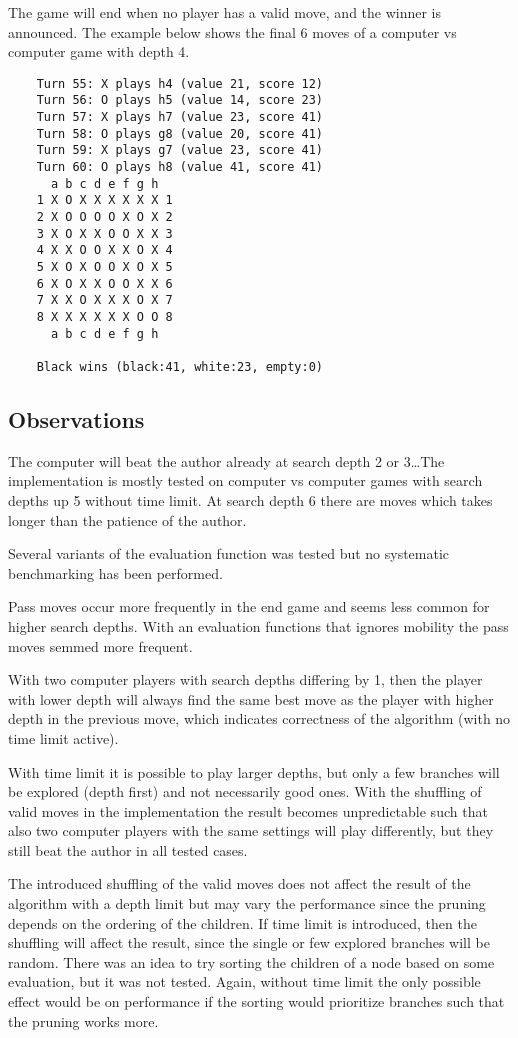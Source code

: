 \documentclass[a4paper]{article}
\begin{document}
The game will end when no player has a valid move, and the winner is announced. The example below shows the final 6 moves of a computer vs computer game with depth 4.
\begin{verbatim}
    Turn 55: X plays h4 (value 21, score 12)
    Turn 56: O plays h5 (value 14, score 23)
    Turn 57: X plays h7 (value 23, score 41)
    Turn 58: O plays g8 (value 20, score 41)
    Turn 59: X plays g7 (value 23, score 41)
    Turn 60: O plays h8 (value 41, score 41)
      a b c d e f g h
    1 X O X X X X X X 1
    2 X O O O O X O X 2
    3 X O X X O O X X 3
    4 X X O O X X O X 4
    5 X O X O O X O X 5
    6 X O X X O O X X 6
    7 X X O X X X O X 7
    8 X X X X X X O O 8
      a b c d e f g h
    
    Black wins (black:41, white:23, empty:0)
\end{verbatim}

\subsection{Observations}
The computer will beat the author already at search depth 2 or 3\ldots The implementation is mostly tested on computer vs computer games with search depths up 5 without time limit. At search depth 6 there are moves which takes longer than the patience of the author. 

Several variants of the evaluation function was tested but no systematic benchmarking has been performed. 

Pass moves occur more frequently in the end game and seems less common for higher search depths. With an evaluation functions that ignores mobility the pass moves semmed more frequent.

With two computer players with search depths differing by 1, then the player with lower depth will always find the same best move as the player with higher depth in the previous move, which indicates correctness of the algorithm (with no time limit active). 

With time limit it is possible to play larger depths, but only a few branches will be explored (depth first) and not necessarily good ones. With the shuffling of valid moves in the implementation the result becomes unpredictable such that also two computer players with the same settings will play differently, but they still beat the author in all tested cases. 

The introduced shuffling of the valid moves does not affect the result of the algorithm with a depth limit but may vary the performance since the pruning depends on the ordering of the children. If time limit is introduced, then the shuffling will affect the result, since the single or few explored branches will be random. There was an idea to try sorting the children of a node based on some evaluation, but it was not tested. Again, without time limit the only possible effect would be on performance if the sorting would prioritize branches such that the pruning works more. 
\end{document}
